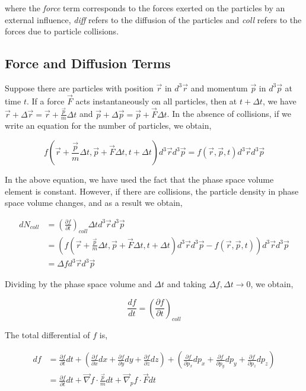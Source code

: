 \no 	where the \textit{force} term corresponds to the forces exerted on the particles by an external influence, \textit{diff} refers to the diffusion of the particles and \textit{coll} refers to the forces due to particle collisions.

\subsection{Force and Diffusion Terms}

Suppose there are particles with position $\vec{r} $ in $ d^3 \vec{r}$ and momentum $ \vec{p} $ in $ d^3 \vec{p}$ at time  $t$. If a force $\vec{F}$ acts instantaneously on all particles, then at $ t + \Delta t $, we have $ \vec{r} + \Delta \vec{r} = \vec{r} + \frac{\vec{p}}{m} \Delta t $ and $ \vec{p} + \Delta \vec{p} = \vec{p} + \vec{F} \Delta t $. In the absence of collisions, if we write an equation for the number of particles, we obtain,

\begin{equation}
	f(\vec{r} + \frac{\vec{p}}{m} \Delta t, \vec{p} + \vec{F} \Delta t, t + \Delta t) d^3\vec{r} d^3\vec{p} = f(\vec{r}, \vec{p}, t) d^3\vec{r} d^3\vec{p}
\end{equation}

\no In the above equation, we have used the fact that the phase space volume element is constant. However, if there are collisions, the particle density in phase space volume changes, and as a result we obtain,

\begin{align}
		dN_{coll} &= \left( \frac{\partial f}{\partial t} \right)_{coll} \Delta t d^3\vec{r} d^3\vec{p} \\	
		&=\left( f(\vec{r} + \frac{\vec{p}}{m} \Delta t, \vec{p} + \vec{F} \Delta t, t + \Delta t) d^3\vec{r} d^3\vec{p} - f(\vec{r}, \vec{p}, t) \right)d^3\vec{r} d^3\vec{p} \\
		&= \Delta f d^3\vec{r} d^3\vec{p}
\end{align}

\no Dividing by the phase space volume and $ \Delta t $ and taking $ \Delta f, \Delta t \to 0 $, we obtain,

\begin{equation}
	\frac{df}{dt} = \left( \frac{\partial f}{\partial t} \right)_{coll}
\end{equation}

\no The total differential of $ f $ is,

\begin{align}
	df &= \frac{\partial f}{\partial t} dt + \left( \frac{\partial f}{\partial x} dx + \frac{\partial f}{\partial y} dy + \frac{\partial f}{\partial z} dz \right) + \left( \frac{\partial f}{\partial p_x} dp_x + \frac{\partial f}{\partial p_y} dp_y + \frac{\partial f}{\partial p_z} dp_z \right) \\
	&= \frac{\partial f}{\partial t} dt + \vec{\nabla}f \cdot \frac{\vec{p}}{m}dt + \vec{\nabla}_p f \cdot \vec{F}dt
\end{align}

